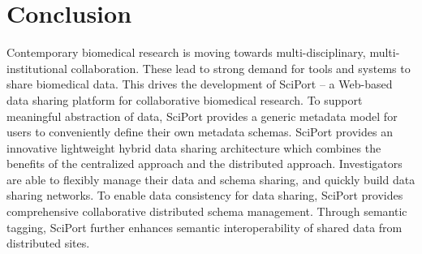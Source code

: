 \documentclass{singlecol-new}
\theoremstyle{TH}{
\newtheorem{lemma}{Lemma}
\newtheorem{theorem}[lemma]{Theorem}
\newtheorem{corrolary}[lemma]{Corrolary}
\newtheorem{conjecture}[lemma]{Conjecture}
\newtheorem{proposition}[lemma]{Proposition}
\newtheorem{claim}[lemma]{Claim}
\newtheorem{stheorem}[lemma]{Wrong Theorem}
\newtheorem{algorithm}{Algorithm}
}
\theoremstyle{THrm}{
\newtheorem{definition}{Definition}[section]
\newtheorem{question}{Question}[section]
\newtheorem{remark}{Remark}
\newtheorem{scheme}{Scheme}
}
\theoremstyle{THhit}{
\newtheorem{case}{Case}[section]
}
\begin{document}
\section{Conclusion}

Contemporary biomedical research is moving towards
multi-disciplinary, multi-institutional collaboration. These lead to
strong demand for tools and systems to share biomedical data. This
drives the development of SciPort -- a Web-based data sharing
platform for collaborative biomedical research. To support
meaningful abstraction of data, SciPort provides a generic metadata
model for users to conveniently define their own metadata schemas.
SciPort provides an innovative lightweight hybrid data sharing
architecture which combines the benefits of the centralized approach
and the distributed approach. Investigators are able to flexibly
manage their data and schema sharing, and quickly build data sharing
networks. To enable data consistency for data sharing, SciPort
provides comprehensive collaborative distributed schema management.
Through semantic tagging, SciPort further enhances semantic
interoperability of shared data from distributed sites.




%
%
%
\end{document}
